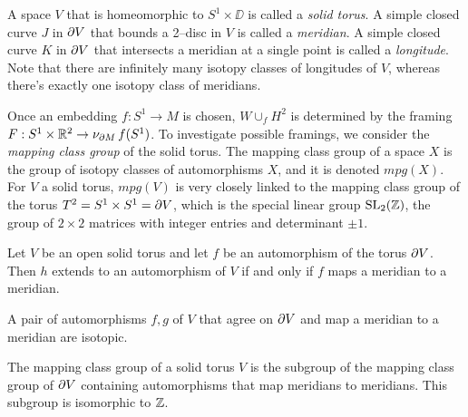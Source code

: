 \begin{defn}
	A space $V$ that is homeomorphic to $S^1\times\DD$ is called a \emph{solid torus}.	
	A simple closed curve $J$ in $\partial V$ that bounds a 2--disc in $V$ is called a \emph{meridian}.
	A simple closed curve $K$ in $\partial V$ that intersects a meridian at a single point is called a \emph{longitude}.
	Note that there are infinitely many isotopy classes of longitudes of $V$, whereas there's exactly one isotopy class of meridians.
\end{defn}

Once an embedding $f:S^1\to M$ is chosen, $W\cup_f H^2$ is determined by the framing $F:S^1\times \mathbb{R}^2\to \nu_{\partial M}\,f(S^1)$.
To investigate possible framings, we consider the \emph{mapping class group} of the solid torus.
The mapping class group of a space $X$ is the group of isotopy classes of automorphisms $X$, and it is denoted $mpg(X)$.
For $V$ a solid torus, $mpg(V)$ is very closely linked to the mapping class group of the torus $T^2 = S^1\times S^1=\partial V$, which is the special linear group $\textrm{SL}_2(\mathbb{Z})$, the group of $2\times 2$ matrices with integer entries and determinant $\pm 1$.
\begin{lem}
	Let $V$ be an open solid torus and let $f$ be an automorphism of the torus $\partial V$.
	Then $h$ extends to an automorphism of $V$ if and only if $f$ maps a meridian to a meridian.	
\end{lem}

\begin{lem}
	A pair of automorphisms $f,g$ of $V$ that agree on $\partial V$ and map a meridian to a meridian are isotopic.	
\end{lem}

\begin{theorem}
	The mapping class group of a solid torus $V$ is the subgroup of the mapping class group of $\partial V$ containing automorphisms that map meridians to meridians.
	This subgroup is isomorphic to $\mathbb{Z}$.	
\end{theorem}

